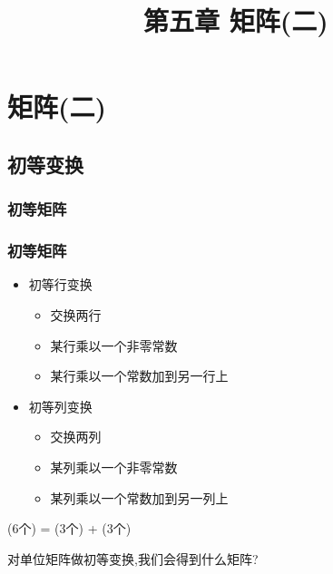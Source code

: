 \renewcommand{\mydate}{2025年03月27号\ 第十次课}

\makeatletter
\ifodd\value{page}
\else
\begin{frame}[plain]
\end{frame}
\fi
\makeatother


\section{矩阵(二)}


\title{第五章 \quad 矩阵(二)}
\author{}
\date{}

\frame{\titlepage}


\subsection{初等变换}


\subsubsection{初等矩阵}
\begin{frame}\frametitle{初等矩阵}
\begin{itemize}
\item 初等行变换
\pp
\begin{itemize}
\item 交换两行
\item 某行乘以一个非零常数
\item 某行乘以一个常数加到另一行上
\end{itemize}
\pp
\item 初等列变换
\pp
\begin{itemize}
\item 交换两列
\item 某列乘以一个非零常数
\item 某列乘以一个常数加到另一列上
\end{itemize}
\end{itemize}
\pp

(6个) = (3个) + (3个)

\bigskip

 对单位矩阵做初等变换,我们会得到什么矩阵?
\end{frame}








